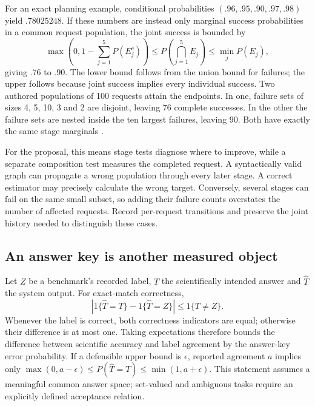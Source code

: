 For an exact planning example, conditional probabilities
$(.96,.95,.90,.97,.98)$ yield $.78025248$. If these numbers are instead only
marginal success probabilities in a common request population, the joint
success is bounded by
\begin{equation}
 \max\!\left(0,1-\sum_{j=1}^5P(E_j^c)\right)
 \leq P\!\left(\bigcap_{j=1}^5 E_j\right)
 \leq\min_jP(E_j),
 \label{exec13:frontier-frechet}
\end{equation}
giving $.76$ to $.90$. The lower bound follows from the union bound for
failures; the upper follows because joint success implies every individual
success. Two authored populations of 100 requests attain the endpoints. In
one, failure sets of sizes 4, 5, 10, 3 and 2 are disjoint, leaving 76 complete
successes. In the other the failure sets are nested inside the ten largest
failures, leaving 90. Both have exactly the same stage marginals
\cite{exec13_frontier_exact}.

For the proposal, this means stage tests diagnose where to improve, while a
separate composition test measures the completed request. A syntactically
valid graph can propagate a wrong population through every later stage. A
correct estimator may precisely calculate the wrong target. Conversely,
several stages can fail on the same small subset, so adding their failure
counts overstates the number of affected requests. Record per-request
transitions and preserve the joint history needed to distinguish these cases.

\subsection{An answer key is another measured object}

Let $Z$ be a benchmark's recorded label, $T$ the scientifically intended answer
and $\widehat T$ the system output. For exact-match correctness,
\begin{equation}
 \left|1\{\widehat T=T\}-1\{\widehat T=Z\}\right|
 \leq1\{T\ne Z\}.
 \label{exec13:frontier-oracle}
\end{equation}
Whenever the label is correct, both correctness indicators are equal;
otherwise their difference is at most one. Taking expectations therefore
bounds the difference between scientific accuracy and label agreement by the
answer-key error probability. If a defensible upper bound is $\epsilon$,
reported agreement $a$ implies only
$\max(0,a-\epsilon)\leq P(\widehat T=T)\leq\min(1,a+\epsilon)$.
This statement assumes a meaningful common answer space; set-valued and
ambiguous tasks require an explicitly defined acceptance relation.

